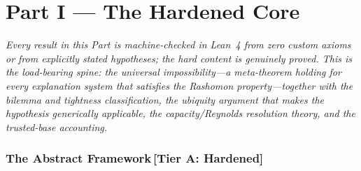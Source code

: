 \documentclass[11pt,a4paper]{article}
\begin{document}



\clearpage
\part{Part I \textnormal{\large --- The Hardened Core}}
\noindent\emph{Every result in this Part is machine-checked in Lean~4 from zero custom axioms or from explicitly stated hypotheses; the hard content is genuinely proved. This is the load-bearing spine: the universal impossibility---a meta-theorem holding for \emph{every} explanation system that satisfies the Rashomon property---together with the bilemma and tightness classification, the ubiquity argument that makes the hypothesis generically applicable, the capacity/Reynolds resolution theory, and the trusted-base accounting.}\par\medskip

\section{The Abstract Framework\,\textnormal{\normalsize[Tier A: Hardened]}}
\label{sec:framework}
\end{document}
